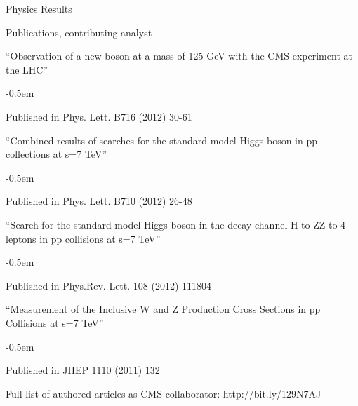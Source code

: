 \documentclass{resume} %
\begin{document}
\begin{rSection}{Physics Results}
\begin{rSubsection}{Publications, contributing analyst}{}{}{}
\item ``Observation of a new boson at a mass of 125 GeV with the CMS experiment
at the LHC''
    \begin{list}{}{\leftmargin=1.5em} 
      \itemsep -0.5em \vspace{-0.5em} %
      \item Published in Phys. Lett. B716 (2012) 30-61
    \end{list}
\item ``Combined results of searches for the standard model Higgs boson in pp
collections at s=7 TeV''
    \begin{list}{}{\leftmargin=1.5em} 
      \itemsep -0.5em \vspace{-0.5em} %
      \item Published in Phys. Lett. B710 (2012) 26-48
    \end{list}
\item ``Search for the standard model Higgs boson in the decay channel H to ZZ
to 4 leptons in pp collisions at s=7 TeV''
    \begin{list}{}{\leftmargin=1.5em} 
      \itemsep -0.5em \vspace{-0.5em} %
      \item Published in Phys.Rev. Lett. 108 (2012) 111804
    \end{list}
\item ``Measurement of the Inclusive W and Z Production Cross Sections in pp
Collisions at s=7 TeV''
    \begin{list}{}{\leftmargin=1.5em} 
      \itemsep -0.5em \vspace{-0.5em} %
      \item Published in JHEP 1110 (2011) 132
    \end{list}
\end{rSubsection}

\begin{rBlankSubsection}{Full list of authored articles as CMS collaborator:   
http://bit.ly/129N7AJ}{}{}{}
\end{rBlankSubsection}


\end{rSection}
\end{document}
